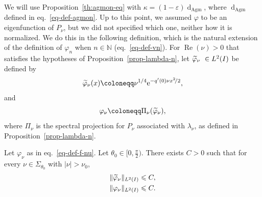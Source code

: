 \documentclass[10pt]{amsart}
\theoremstyle{definition}\newtheorem{defi}[theo]{Definition}\newtheorem{rema}[theo]{Remark}\newtheorem{exam}[theo]{Example}\newtheorem{exem}[theo]{Example}\newtheorem{nota}[theo]{Notation}
\renewcommand{\leq}{\leqslant}
\newcommand{\1}{\mathds 1}
\DeclareMathOperator{\Ree}{Re}
\newcommand{\dagmon}{\mathop{\mathrm{d}}\nolimits_{\mathrm{Agm}}}
\newcommand{\N}{\mathbb{N}}
\newcommand{\eu}{\mathrm e}
\newcommand{\sector}[1][\theta_0]{\Sigma_{#1}}
\newcommand{\e}{\varepsilon}
\newcommand{\f}{\varphi}
\let\oldtilde\tilde
\renewcommand*{\tilde}[1]{\mathchoice{\widetilde{#1}}{\widetilde{#1}}{\oldtilde{#1}}{\oldtilde{#1}}}
\begin{document}
We will use Proposition~\ref{th:agmon-eq} with $\kappa = (1-\e)\dagmon$, where $\dagmon$ defined in eq.~\eqref{eq-def-agmon}. Up to this point, we assumed $\f$ to be an eigenfunction of $P_\nu$, but we did not specified which one, neither how it is normalized. We do this in the following definition, which is the natural extension of the definition of $\f_n$ when $n\in\N$ (eq.~\eqref{eq-def-vn}). For $\Ree(\nu)>0$ that satisfies the hypotheses of Proposition~\ref{prop-lambda-n}, let $\tilde \f_\nu\ \in L^2(I)$ be defined by
\begin{equation*}
\tilde \f_\nu(x) \coloneqq \nu^{1/4} \eu^{-q'(0) \nu x^2\!/2},
\end{equation*}
and
\begin{equation}\label{eq-def-f-nu}
\f_\nu \coloneqq \Pi_\nu(\tilde \f_\nu),
\end{equation}
where $\Pi_\nu$ is the spectral projection for $P_\nu$ associated with $\lambda_\nu$, as defined in Proposition~\ref{prop-lambda-n}.

\begin{prop}\label{th:est-vnu-l2}
Let $\f_\nu$ as in eq.~\eqref{eq-def-f-nu}. Let $\theta_0 \in \big[0,\frac \pi 2 \big)$. There exists $C >0$ such that for every $\nu \in \sector$ with $|\nu|>\nu_0$,
\begin{gather*}
\|\tilde \f_\nu\|_{L^2(I)} \leq C,\\
\|\f_\nu\|_{L^2(I)} \leq C.
\end{gather*}
\end{prop}
\end{document}

